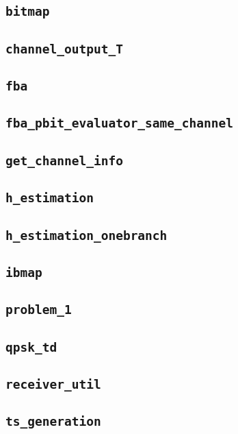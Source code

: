 \documentclass[10pt]{article}
\numberwithin{equation}{section}
\begin{document}
\subsection*{\texttt{bitmap}}

\subsection*{\texttt{channel\_output\_T}}

\subsection*{\texttt{fba}}

\subsection*{\texttt{fba\_pbit\_evaluator\_same\_channel}}

\subsection*{\texttt{get\_channel\_info}}

\subsection*{\texttt{h\_estimation}}

\subsection*{\texttt{h\_estimation\_onebranch}}

\subsection*{\texttt{ibmap}}

\subsection*{\texttt{problem\_1}}

\subsection*{\texttt{qpsk\_td}}

\subsection*{\texttt{receiver\_util}}

\subsection*{\texttt{ts\_generation}}

\end{document}
